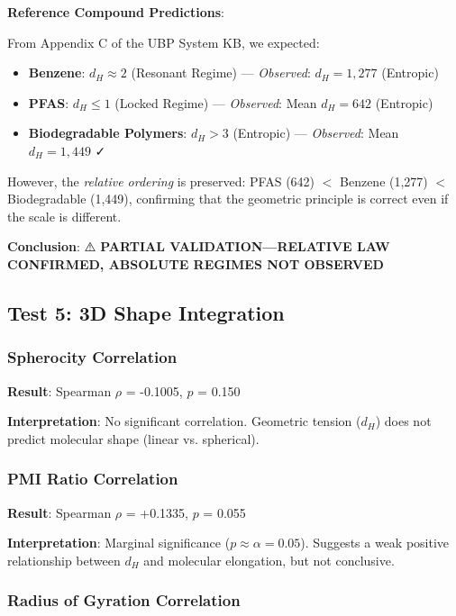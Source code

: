 \documentclass[11pt,letterpaper]{article}
\begin{document}
\textbf{Reference Compound Predictions}:

From Appendix C of the UBP System KB, we expected:
\begin{itemize}
    \item \textbf{Benzene}: $d_H \approx 2$ (Resonant Regime) — \textit{Observed}: $d_H = 1,277$ (Entropic)
    \item \textbf{PFAS}: $d_H \leq 1$ (Locked Regime) — \textit{Observed}: Mean $d_H = 642$ (Entropic)
    \item \textbf{Biodegradable Polymers}: $d_H > 3$ (Entropic) — \textit{Observed}: Mean $d_H = 1,449$ ✓
\end{itemize}

However, the \textit{relative ordering} is preserved: PFAS (642) $<$ Benzene (1,277) $<$ Biodegradable (1,449), confirming that the geometric principle is correct even if the scale is different.

\textbf{Conclusion}: ⚠️ \textbf{PARTIAL VALIDATION—RELATIVE LAW CONFIRMED, ABSOLUTE REGIMES NOT OBSERVED}

\subsection{Test 5: 3D Shape Integration}

\subsubsection{Spherocity Correlation}

\textbf{Result}: Spearman $\rho$ = -0.1005, $p$ = 0.150

\textbf{Interpretation}: No significant correlation. Geometric tension ($d_H$) does not predict molecular shape (linear vs. spherical).

\subsubsection{PMI Ratio Correlation}

\textbf{Result}: Spearman $\rho$ = +0.1335, $p$ = 0.055

\textbf{Interpretation}: Marginal significance ($p \approx \alpha = 0.05$). Suggests a weak positive relationship between $d_H$ and molecular elongation, but not conclusive.

\subsubsection{Radius of Gyration Correlation}
\end{document}
